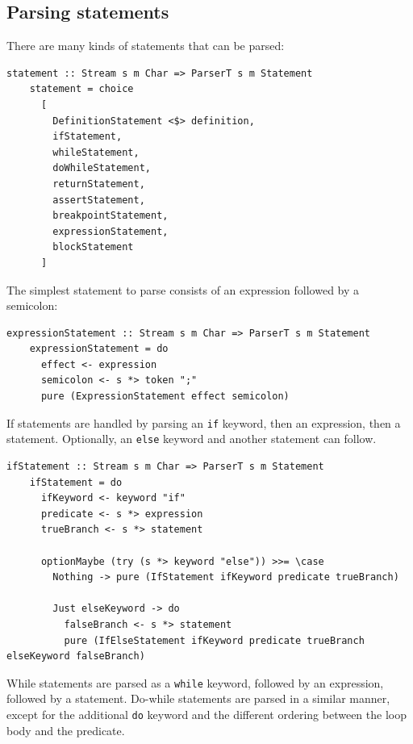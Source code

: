 \documentclass[UdineBachThesis,american,11pt]{PhdThesis}
\begin{document}
  \subsection{Parsing statements}

  There are many kinds of statements that can be parsed:

  \begin{Verbatim}[gobble=4,fontsize=\small]
    statement :: Stream s m Char => ParserT s m Statement
    statement = choice
      [
        DefinitionStatement <$> definition,
        ifStatement,
        whileStatement,
        doWhileStatement,
        returnStatement,
        assertStatement,
        breakpointStatement,
        expressionStatement,
        blockStatement
      ]
  \end{Verbatim}

  The simplest statement to parse consists of an expression followed by a
  semicolon:

  \begin{Verbatim}[gobble=4,fontsize=\small]
    expressionStatement :: Stream s m Char => ParserT s m Statement
    expressionStatement = do
      effect <- expression
      semicolon <- s *> token ";"
      pure (ExpressionStatement effect semicolon)
  \end{Verbatim}

  If statements are handled by parsing an \mbox{\texttt{if}} keyword, then an
  expression, then a statement. Optionally, an \mbox{\texttt{else}} keyword and
  another statement can follow.

  \begin{Verbatim}[gobble=4,fontsize=\small]
    ifStatement :: Stream s m Char => ParserT s m Statement
    ifStatement = do
      ifKeyword <- keyword "if"
      predicate <- s *> expression
      trueBranch <- s *> statement

      optionMaybe (try (s *> keyword "else")) >>= \case
        Nothing -> pure (IfStatement ifKeyword predicate trueBranch)

        Just elseKeyword -> do
          falseBranch <- s *> statement
          pure (IfElseStatement ifKeyword predicate trueBranch elseKeyword falseBranch)
  \end{Verbatim}

  While statements are parsed as a \mbox{\texttt{while}} keyword, followed by an
  expression, followed by a statement. Do-while statements are parsed in a
  similar manner, except for the additional \mbox{\texttt{do}} keyword and the
  different ordering between the loop body and the predicate.
\end{document}
